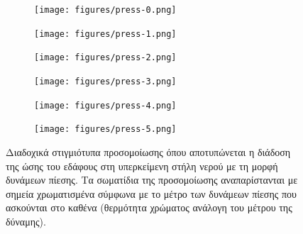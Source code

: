 \begin{figure}[h]
  \begin{subfigure}{.5\textwidth}
    \centering
    \texttt{[image: figures/press-0.png]}
  \end{subfigure}
  \begin{subfigure}{.5\textwidth}
    \centering
    \texttt{[image: figures/press-1.png]}
  \end{subfigure}
  \begin{subfigure}{.5\textwidth}
    \centering
    \texttt{[image: figures/press-2.png]}
  \end{subfigure}
  \begin{subfigure}{.5\textwidth}
    \centering
    \texttt{[image: figures/press-3.png]}
  \end{subfigure}
  \begin{subfigure}{.5\textwidth}
    \centering
    \texttt{[image: figures/press-4.png]}
  \end{subfigure}
  \begin{subfigure}{.5\textwidth}
    \centering
    \texttt{[image: figures/press-5.png]}
  \end{subfigure}
  \caption[Διάδοση δυνάμεων πίεσης]{Διαδοχικά στιγμιότυπα προσομοίωσης όπου αποτυπώνεται η
    διάδοση της ώσης του εδάφους στη υπερκείμενη στήλη νερού με τη μορφή δυνάμεων
    πίεσης. Τα σωματίδια της προσομοίωσης αναπαρίστανται με σημεία χρωματισμένα σύμφωνα με
    το μέτρο των δυνάμεων πίεσης που ασκούνται στο καθένα (θερμότητα χρώματος ανάλογη του
    μέτρου της δύναμης).}
  \label{fig:pressure-forces}
\end{figure}

